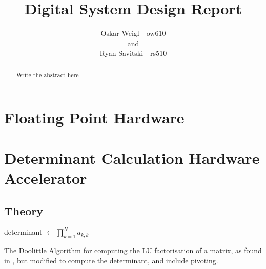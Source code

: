 \documentclass[]{article}
\title{Digital System Design Report}
\author{Oskar Weigl - ow610\\ and \\ Ryan Savitski - rs510}
\begin{document}
\maketitle

\begin{abstract}
	Write the abstract here
\end{abstract}

\tableofcontents
\clearpage

\section{Floating Point Hardware} %
\label{sec:floating_point_hardware}


\section{Determinant Calculation Hardware Accelerator} %
\label{sec:determinant_calculation_hardware_accelerator}




\subsection{Theory} %
\label{sub:theory}

\begin{algorithm}[H]
	\SetAlgoLined



	determinant $\leftarrow \prod_{k=1}^N a_{k,k}$
	\bigskip

	\caption{The Doolittle Algorithm for computing the LU factorisation of a matrix, as found in \cite{LUgen}, but modified to compute the determinant, and include pivoting.}
\end{algorithm}
\end{document}
